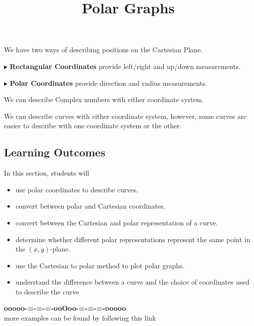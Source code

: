 \documentclass{ximera}
\title{Polar Graphs}
\begin{document}
\begin{abstract}
\end{abstract}
\maketitle





We have two ways of describing positions on the Cartesian Plane.


$\blacktriangleright$ \textbf{Rectangular Coordinates} provide left/right and up/down measurements.





$\blacktriangleright$ \textbf{Polar Coordinates} provide direction and radius measurements.




We can describe Complex numbers with either coordinate system.


We can describe curves with either coordinate system, however, some curves are easier to describe with one coordinate system or the other.



\subsection*{Learning Outcomes}



\begin{sectionOutcomes}
In this section, students will 

\begin{itemize}
\item use polar coordinates to describe curves.
\item convert between polar and Cartesian coordinates.
\item convert between the Cartesian and polar representation of a curve.
\item determine whether different polar representations represent the same point in the $(x,y)$-plane.
\item use the Cartesian to polar method to plot polar graphs.
\item understand the difference between a curve and the choice of coordinates used to describe the curve
\end{itemize}
\end{sectionOutcomes}











\begin{center}
\textbf{\textcolor{green!50!black}{ooooo-=-=-=-ooOoo-=-=-=-ooooo}} \\

more examples can be found by following this link\\ 

\end{center}
\end{document}
